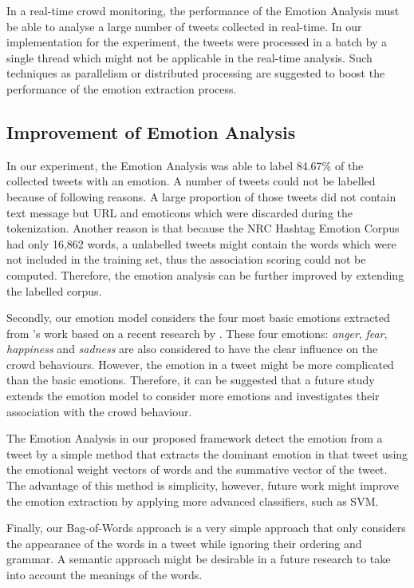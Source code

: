 In a real-time crowd monitoring, the performance of the Emotion Analysis must be able to analyse a large number of tweets collected in real-time. In our implementation for the experiment, the tweets were processed in a batch by a single thread which might not be applicable in the real-time analysis. Such techniques as parallelism or distributed processing are suggested to boost the performance of the emotion extraction process.

\subsection{Improvement of Emotion Analysis}
In our experiment, the Emotion Analysis was able to label 84.67\% of the collected tweets with an emotion. A number of tweets could not be labelled because of following reasons. A large proportion of those tweets did not contain text message but URL and emoticons which were discarded during the tokenization. Another reason is that because the NRC Hashtag Emotion Corpus had only 16,862 words, a unlabelled tweets might contain the words which were not included in the training set, thus the association scoring could not be computed. Therefore, the emotion analysis can be further improved by extending the labelled corpus.

Secondly, our emotion model considers the four most basic emotions extracted from \citet{ekman1971constants}'s work based on a recent research by \citet{Jack2014}. These four emotions: \textit{anger}, \textit{fear}, \textit{happiness} and \textit{sadness} are also considered to have the clear influence on the crowd behaviours. However, the emotion in a tweet might be more complicated than the basic emotions. Therefore, it can be suggested that a future study extends the emotion model to consider more emotions and investigates their association with the crowd behaviour.

The Emotion Analysis in our proposed framework detect the emotion from a tweet by a simple method that extracts the dominant emotion in that tweet using the emotional weight vectors of words and the summative vector of the tweet. The advantage of this method is simplicity, however, future work might improve the emotion extraction by applying more advanced classifiers, such as SVM.

Finally, our Bag-of-Words approach is a very simple approach that only considers the appearance of the words in a tweet while ignoring their ordering and grammar. A semantic approach might be desirable in a future research to take into account the meanings of the words.

